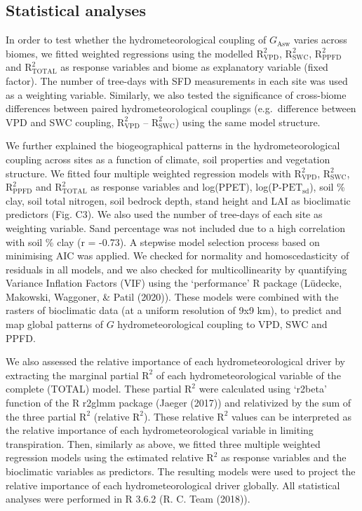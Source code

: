 \documentclass[11pt,twoside]{reedthesis}
\begin{document}
\subsection{Statistical analyses}\label{statistical-analyses}

In order to test whether the hydrometeorological coupling of
\(G_{\text{Asw}}\) varies across biomes, we fitted weighted regressions
using the modelled \(\text{R}^2_{\text{VPD}}\),
\(\text{R}^2_{\text{SWC}}\), \(\text{R}^2_{\text{PPFD}}\) and
\(\text{R}^2_{\text{TOTAL}}\) as response variables and biome as
explanatory variable (fixed factor). The number of tree-days with SFD
measurements in each site was used as a weighting variable. Similarly,
we also tested the significance of cross-biome differences between
paired hydrometeorological couplings (e.g.~difference between VPD and
SWC coupling, \(\text{R}^2_{\text{VPD}}\) --
\(\text{R}^2_{\text{SWC}}\)) using the same model structure.\par

We further explained the biogeographical patterns in the
hydrometeorological coupling across sites as a function of climate, soil
properties and vegetation structure. We fitted four multiple weighted
regression models with \(\text{R}^2_{\text{VPD}}\),
\(\text{R}^2_{\text{SWC}}\), \(\text{R}^2_{\text{PPFD}}\) and
\(\text{R}^2_{\text{TOTAL}}\) as response variables and log(PPET),
log(\(\text{P-PET}_{\text{sd}}\)), soil \% clay, soil total nitrogen,
soil bedrock depth, stand height and LAI as bioclimatic predictors (Fig.
C3). We also used the number of tree-days of each site as weighting
variable. Sand percentage was not included due to a high correlation
with soil \% clay (r = -0.73). A stepwise model selection process based
on minimising AIC was applied. We checked for normality and
homoscedasticity of residuals in all models, and we also checked for
multicollinearity by quantifying Variance Inflation Factors (VIF) using
the `performance' R package (Lüdecke, Makowski, Waggoner, \& Patil
(2020)). These models were combined with the rasters of bioclimatic data
(at a uniform resolution of 9x9 km), to predict and map global patterns
of \(G\) hydrometeorological coupling to VPD, SWC and PPFD.\par

We also assessed the relative importance of each hydrometeorological
driver by extracting the marginal partial \(\text{R}^2\) of each
hydrometeorological variable of the complete (TOTAL) model. These
partial \(\text{R}^2\) were calculated using `r2beta' function of the R
r2glmm package (Jaeger (2017)) and relativized by the sum of the three
partial \(\text{R}^2\) (relative \(\text{R}^2\)). These relative
\(\text{R}^2\) values can be interpreted as the relative importance of
each hydrometeorological variable in limiting transpiration. Then,
similarly as above, we fitted three multiple weighted regression models
using the estimated relative \(\text{R}^2\) as response variables and
the bioclimatic variables as predictors. The resulting models were used
to project the relative importance of each hydrometeorological driver
globally. All statistical analyses were performed in R 3.6.2 (R. C. Team
(2018)).\par
\end{document}
